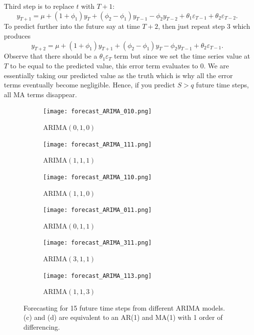 \documentclass{article}
\begin{document}
  Third step is to replace $t$ with $T+1$:
  \begin{equation*}
    y_{T+1} = \mu + (1 + \phi_1)y_{T} + (\phi_2 - \phi_1)y_{T-1} - \phi_2y_{T-2} + \theta_1\varepsilon_{T-1} + \theta_2\varepsilon_{T-2}.
  \end{equation*}
  To predict further into the future say at time $T+2$, then just repeat step 3 which produces
  \begin{equation*}
    y_{T+2} = \mu + (1 + \phi_1)y_{T+1} + (\phi_2 - \phi_1)y_{T} - \phi_2y_{T-1} + \theta_2\varepsilon_{T-1}.
  \end{equation*}
  Observe that there should be a $\theta_1\varepsilon_{T}$ term but since we set the time series value at $T$ to be equal to the predicted value, this error term evaluates to 0. We are essentially taking our predicted value as the truth which is why all the error terms eventually become negligible. Hence, if you predict $S > q$ future time steps, all MA terms disappear. 

  \begin{figure}[H]
    \centering
    \captionsetup{justification=centering}
    \begin{subfigure}[b]{0.49\linewidth}
      \texttt{[image: forecast\_ARIMA\_010.png]}
      \caption{ARIMA$(0, 1, 0)$}
    \end{subfigure}
    \begin{subfigure}[b]{0.49\linewidth}
      \texttt{[image: forecast\_ARIMA\_111.png]}
      \caption{ARIMA$(1, 1, 1)$}
    \end{subfigure}
    \begin{subfigure}[b]{0.49\linewidth}
      \texttt{[image: forecast\_ARIMA\_110.png]}
      \caption{ARIMA$(1, 1, 0)$}
    \end{subfigure}
    \begin{subfigure}[b]{0.49\linewidth}
      \texttt{[image: forecast\_ARIMA\_011.png]}
      \caption{ARIMA$(0, 1, 1)$}
    \end{subfigure}
    \begin{subfigure}[b]{0.49\linewidth}
      \texttt{[image: forecast\_ARIMA\_311.png]}
      \caption{ARIMA$(3, 1, 1)$}
    \end{subfigure}
    \begin{subfigure}[b]{0.49\linewidth}
      \texttt{[image: forecast\_ARIMA\_113.png]}
      \caption{ARIMA$(1, 1, 3)$}
    \end{subfigure}
    \caption{Forecasting for 15 future time steps from different ARIMA models. (c) and (d) are equivalent to an AR(1) and MA(1) with 1 order of differencing.}
  \end{figure}
\end{document}
